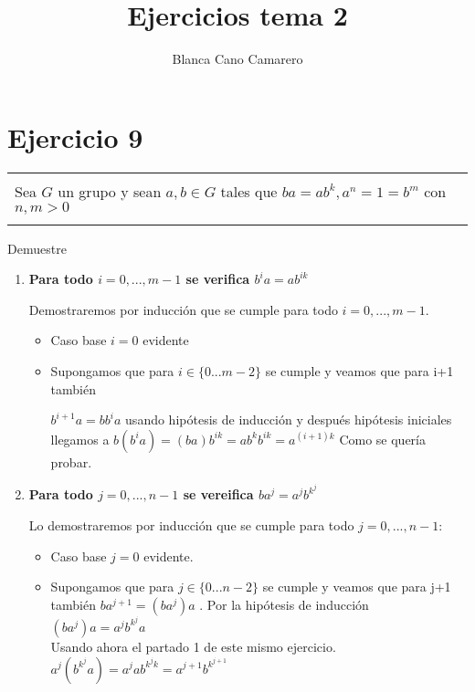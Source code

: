 \documentclass[12pt]{article}
\title{Ejercicios tema 2}
\author{Blanca Cano Camarero}
\newenvironment{micaja}
{
    \begin{center}
    \begin{tabular}{|p{0.9\textwidth}|}
    \hline\\
    }   
    {   
    \\\\\hline
    \end{tabular} 
    \end{center}
    }
\begin{document}
\begin{titlepage}
\maketitle
\tableofcontents
\end{titlepage}

\section[Ejercicio 9]{Ejercicio 9}
\begin{micaja}
Sea $G$ un grupo y sean $a,b \in G$ tales que $ba = ab^k , a^n = 1 = b^m$
con $n,m>0$
\end{micaja}

Demuestre 
\begin{enumerate}
 
    \item \textbf{Para todo $i=0,...,m-1$ se verifica $b^i a = a b^{ik}$}
    
    Demostraremos por inducción que se cumple para todo $i=0,...,m-1$.

    \begin{itemize}
        \item Caso base $i = 0$ evidente
        \item Supongamos que para $i \in \{0...m-2\}$ se cumple y veamos que para i+1 también 
        
        $b^{i+1} a = b b^i a$ usando hipótesis de inducción y después hipótesis iniciales llegamos a  
        $b (b^i a) = (b a) b^{ik}  = a  b^k b^{ik} = a ^{(i+1)k}$  
        Como se quería probar. 
    \end{itemize}  

    \item \textbf{Para todo $j  = 0,...,n-1$ se vereifica $b a^j = a^j b^{k^j}$}
    
    Lo demostraremos por  inducción que se cumple para todo $j=0,...,n-1$: 

    \begin{itemize}
        \item Caso base $j = 0$ evidente.
        \item Supongamos que para $j \in \{0...n-2\}$ se cumple y veamos que para j+1 también 
        $ b a^{j+1} = (b  a ^j ) a$ . 
        Por la hipótesis de inducción $(b  a ^j ) a = a^j b^{k ^j} a$  \\
        Usando ahora el partado 1 de este mismo ejercicio. \\
        $a^j (b^{k ^j} a) = a^j a b^{k^j k } =  a^{j+1}b^{k^{j+1}}$  \\


\end{itemize}
\end{enumerate}
\end{document}
